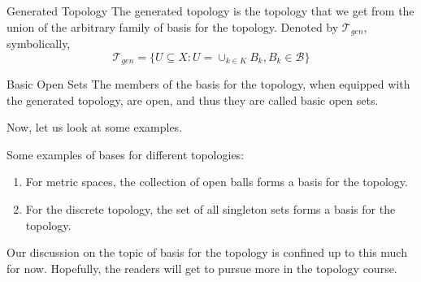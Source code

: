 \begin{Definition}{Generated Topology}\label{generated_topology}
    The generated topology is the topology that we get from the union of the arbitrary family of basis for the topology. Denoted by $\mathcal{T}_{gen}$, symbolically, $$\mathcal{T}_{gen}=\{U\subseteq X:U=\cup_{k\in K}B_k,B_k\in\mathcal{B}\}$$
\end{Definition}
\begin{Definition}{Basic Open Sets}\label{basic_open_set}
    The members of the basis for the topology, when equipped with the generated topology, are open, and thus they are called basic open sets.
\end{Definition}
\noindent Now, let us look at some examples.
\begin{Example}
    Some examples of bases for different topologies:
    \begin{enumerate}
        \item For metric spaces, the collection of open balls forms a basis for the topology.
        \item For the discrete topology, the set of all singleton sets forms a basis for the topology.
    \end{enumerate}
\end{Example}
\noindent Our discussion on the topic of basis for the topology is confined up to this much for now. Hopefully, the readers will get to pursue more in the topology course.
\exercise
